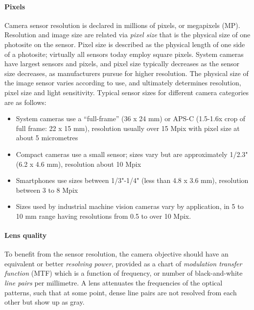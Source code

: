 
\paragraph{Pixels}
Camera sensor resolution is declared in millions of pixels, or megapixels (MP).
Resolution and image size are related via \emph{pixel size} that is the physical size of one photosite on the sensor.
Pixel size is described as the physical length of one side of a photosite; virtually all sensors today employ square pixels.
System cameras have largest sensors and pixels, and pixel size typically decreases as the sensor size decreases, as manufacturers pursue for higher resolution.
The physical size of the image sensor varies according to use, and ultimately determines resolution, pixel size and light sensitivity.
Typical sensor sizes for different camera categories are as follows:

\begin{itemize}
	\item System cameras use a ``full-frame'' (36 x 24 mm) or APS-C (1.5-1.6x crop of full frame: 22 x 15 mm), resolution usually over 15 Mpix with pixel size at about 5 micrometres
	\item Compact cameras use a small sensor; sizes vary but are approximately 1/2.3" (6.2 x 4.6 mm), resolution about 10 Mpix
	\item Smartphones use sizes between 1/3"-1/4" (less than 4.8 x 3.6 mm), resolution between 3 to 8 Mpix
	\item Sizes used by industrial machine vision cameras vary by application, in 5 to 10 mm range having resolutions from 0.5 to over 10 Mpix.
\end{itemize}



\paragraph{Lens quality}
To benefit from the sensor resolution, the camera objective should have an equivalent or better \emph{resolving power}, provided as a chart of \emph{modulation transfer function} (MTF) which is a function of frequency, or number of black-and-white \emph{line pairs} per millimetre.
A lens attenuates the frequencies of the optical patterns, such that at some point, dense line pairs are not resolved from each other but show up as gray.
\cite{nakamura2005image} \cite[p. 71]{kingslake1992optics}

